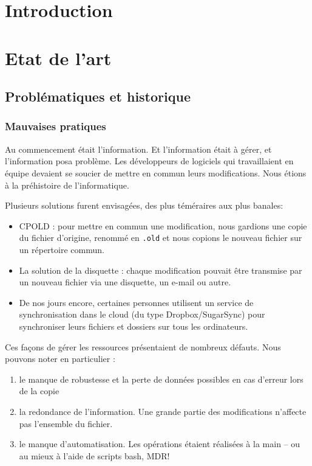 
\section*{Introduction}

\section{Etat de l'art}

\subsection{Problématiques et historique}


\subsubsection{Mauvaises pratiques}

Au commencement était l'information. Et l'information était à gérer, et l'information posa problème. Les développeurs de logiciels qui travaillaient en équipe devaient se soucier de mettre en commun leurs modifications. 
Nous étions à la préhistoire de l'informatique.

Plusieurs solutions furent envisagées, des plus téméraires aux plus banales:
\begin{itemize}
\item CPOLD : pour mettre en commun une modification, nous gardions une copie du fichier d'origine, renommé en \texttt{.old} et nous copions le nouveau fichier sur un répertoire commun. 
\item La solution de la disquette : chaque modification pouvait être transmise par un nouveau fichier via une disquette, un e-mail ou autre.
\item De nos jours encore, certaines personnes utilisent un service de synchronisation dans le cloud (du type Dropbox/SugarSync) pour synchroniser leurs fichiers et dossiers sur tous les ordinateurs. 
\end{itemize}

Ces façons de gérer les ressources présentaient de nombreux défauts. Nous pouvons noter en particulier : 
\begin{enumerate}
\item le manque de robustesse et la perte de données possibles en cas d'erreur lors de la copie
\item la redondance de l'information. Une grande partie des modifications n'affecte pas l'ensemble du fichier. 
\item le manque d'automatisation. Les opérations étaient réalisées à la main -- ou au mieux à l'aide de scripts bash, MDR! 
\end{enumerate}

